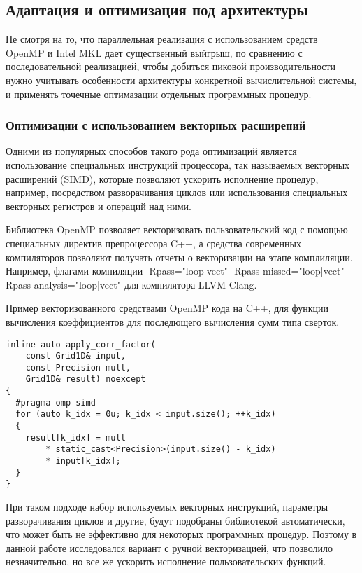 \subsection{Адаптация и оптимизация под архитектуры}
Не смотря на то, что параллельная реализация с использованием средств OpenMP и Intel MKL дает существенный выйгрыш,
по сравнению с последовательной реализацией, чтобы добиться пиковой производительности нужно учитывать особенности
архитектуры конкретной вычислительной системы, и применять точечные оптимазации отдельных программных процедур.

\subsubsection{Оптимизации с использованием векторных расширений}

Одними из популярных способов такого рода оптимизаций является использование специальных инструкций процессора,
так называемых векторных расширений (SIMD), которые позволяют ускорить исполнение процедур, например, посредством
разворачивания циклов или использования специальных векторных регистров и операций над ними.

Библиотека OpenMP позволяет векторизовать пользовательский код с помощью специальных директив препроцессора C++, а средства
современных компиляторов позволяют получать отчеты о векторизации на этапе комплиляции.
Например, флагами компиляции -Rpass="loop|vect" -Rpass-missed="loop|vect" -Rpass-analysis="loop|vect" для компилятора LLVM Clang.

Пример векторизованного средствами OpenMP кода на C++, для функции вычисления коэффициентов для последющего вычисления сумм типа сверток.

\begin{lstlisting}[style={CppCodeStyle}]
inline auto apply_corr_factor(
	const Grid1D& input,
	const Precision mult,
	Grid1D& result) noexcept
{
  #pragma omp simd
  for (auto k_idx = 0u; k_idx < input.size(); ++k_idx)
  {
    result[k_idx] = mult 
    	* static_cast<Precision>(input.size() - k_idx)
    	* input[k_idx];
  }
}
\end{lstlisting}

При таком подходе набор используемых векторных инструкций, параметры разворачивания циклов и другие, будут подобраны библиотекой автоматически,
что может быть не эффективно для некоторых программных процедур. Поэтому в данной работе исследовался вариант с ручной векторизацией,
что позволило незначительно, но все же ускорить исполнение пользовательских функций.

